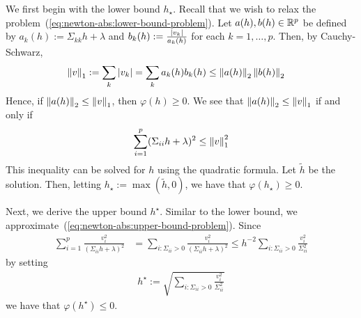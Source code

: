 We first begin with the lower bound $h_\star$.
Recall that we wish to relax the problem~(\ref{eq:newton-abs:lower-bound-problem}).
Let $a(h), b(h) \in \mathbb{R}^p$ be defined by $a_k(h) := \Sigma_{kk} h + \lambda$
and $b_k(h) := \frac{\left|v_k\right|}{a_k(h)}$ for each $k=1,\ldots, p$.
Then, by Cauchy-Schwarz,
\begin{align*}
    \left\|v\right\|_1
    &:=
    \sum\limits_{k} \left|v_k\right|
    =
    \sum\limits_{k} a_k(h) b_k(h)
    \leq
    \left\|a(h)\right\|_{2} \left\|b(h)\right\|_2
\end{align*}
Hence, if $\left\|a(h)\right\|_2 \leq \left\|v\right\|_1$,
then $\varphi(h) \geq 0$.
We see that $\left\|a(h)\right\|_2 \leq \left\|v\right\|_1$ if and only if
\begin{align*}
    \sum\limits_{i=1}^p
    (\Sigma_{ii} h + \lambda)^2
    \leq
    \left\|v\right\|_1^2
\end{align*}
This inequality can be solved for $h$ using the quadratic formula.
Let $\tilde{h}$ be the solution.
Then, letting $h_\star := \max(\tilde{h}, 0)$,
we have that $\varphi(h_{\star}) \geq 0$.

Next, we derive the upper bound $h^\star$.
Similar to the lower bound, we approximate~(\ref{eq:newton-abs:upper-bound-problem}).
Since
\begin{align}
    \sum\limits_{i=1}^p
    \frac{v_i^2}{(\Sigma_{ii} h + \lambda)^2}
    &=
    \sum\limits_{i: \Sigma_{ii} > 0}
    \frac{v_i^2}{(\Sigma_{ii} h + \lambda)^2}
    \leq 
    h^{-2}
    \sum\limits_{i: \Sigma_{ii} > 0}
    \frac{v_i^2}{\Sigma_{ii}^2 }
    \label{eq:nmab:upper-approx}
\end{align}
by setting 
\begin{align*}
    h^\star
    := 
    \sqrt{
        \sum\limits_{i: \Sigma_{ii} > 0} \frac{v_i^2}{\Sigma_{ii}^2}
    }
\end{align*}
we have that $\varphi(h^\star) \leq 0$.


